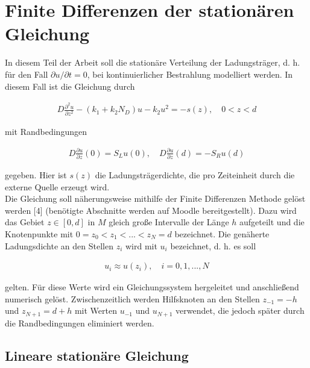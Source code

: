 \documentclass[
	pagesize,
	fontsize=12pt,
	paper=a4,
	oneside,
   reqno
]{scrartcl}
\begin{document}
\clearpage

\section{Finite Differenzen der stationären Gleichung} \label{sec:FiniteDifferenzen}

In diesem Teil der Arbeit soll die stationäre Verteilung der Ladungsträger, d.\xspace h.\xspace für den Fall $\partial u/\partial t = 0$, bei kontinuierlicher Bestrahlung modelliert werden. In diesem Fall ist die Gleichung durch

\begin{align}
   \label{eq:eq4}
   D\frac{\partial^2 u}{\partial z^2} - (k_1 + k_2N_D)u - k_2u^2 = -s(z), \quad 0 < z < d
\end{align}

mit Randbedingungen

\begin{align}
   \label{eq:eq5}
   D\frac{\partial u}{\partial z}(0) = S_Lu(0), \quad D\frac{\partial u}{\partial z}(d) = -S_Ru(d)
\end{align}

gegeben. Hier ist $s(z)$ die Ladungsträgerdichte, die pro Zeiteinheit durch die externe Quelle erzeugt wird. \\

Die Gleichung soll näherungsweise mithilfe der Finite Differenzen Methode gelöst werden [4] (benötigte Abschnitte werden auf Moodle bereitgestellt). Dazu wird das Gebiet $z \in [0, d]$ in $M$ gleich große Intervalle der Länge $h$ aufgeteilt und die Knotenpunkte mit $0 = z_0 < z_1 < ... < z_N = d$ bezeichnet. Die genäherte Ladungsdichte an den Stellen $z_i$ wird mit $u_i$ bezeichnet, d.\xspace h.\xspace es soll

\begin{align*}
   u_i \approx u(z_i), \quad i = 0, 1, ..., N
\end{align*}

gelten. Für diese Werte wird ein Gleichungssystem hergeleitet und anschließend numerisch gelöst. Zwischenzeitlich werden Hilfsknoten an den Stellen $z_{-1} = -h$ und $z_{N+1} = d + h$ mit Werten $u_{-1}$ und $u_{N+1}$ verwendet, die jedoch später durch die Randbedingungen eliminiert werden.

\subsection{Lineare stationäre Gleichung}
\end{document}
